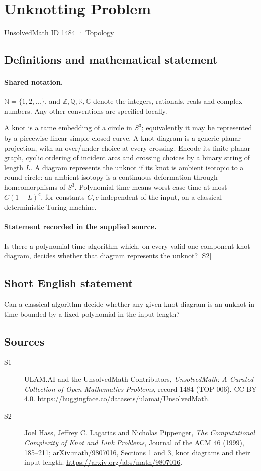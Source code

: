 \documentclass[11pt]{article}
\newcommand{\sref}[2]{\hyperlink{source:#1:#2}{[S#2]}}
\begin{document}
\setcounter{section}{1483}
\section{Unknotting Problem}\label{1484}
{\small\sffamily UnsolvedMath ID 1484 · Topology}
\subsection{Definitions and mathematical statement}

\paragraph{Shared notation.}$\mathbb N=\{1,2,\ldots\}$, and $\mathbb Z,\mathbb Q,\mathbb R,\mathbb C$ denote the integers, rationals, reals and complex numbers. Any other conventions are specified locally.


A knot is a tame embedding of a circle in \(S^3\); equivalently it may
be represented by a piecewise-linear simple closed curve.
A knot diagram is a generic planar projection, with an over/under choice
at every crossing. Encode its finite planar graph, cyclic ordering of
incident arcs and crossing choices by a binary string of length \(L\).
A diagram represents the unknot if its knot is ambient isotopic to a
round circle: an ambient isotopy is a continuous deformation through
homeomorphisms of \(S^3\). Polynomial time means worst-case time
at most \(C(1+L)^c\), for constants \(C,c\) independent of the input,
on a classical deterministic Turing machine.
\paragraph{Statement recorded in the supplied source.}
Is there a polynomial-time algorithm which, on every valid
one-component knot diagram, decides whether that diagram represents
the unknot? \sref{1484}{2}
\subsection{Short English statement}
Can a classical algorithm decide whether any given knot diagram is an unknot in time bounded by a fixed polynomial in the input length?
\subsection{Sources}
\begin{description}
\item[\hypertarget{source:1484:1}{S1}] ULAM.AI and the UnsolvedMath Contributors, \emph{UnsolvedMath: A Curated Collection of Open Mathematics Problems}, record 1484 (TOP-006). CC BY 4.0. \url{https://huggingface.co/datasets/ulamai/UnsolvedMath}.
\item[\hypertarget{source:1484:2}{S2}] Joel Hass, Jeffrey C. Lagarias and Nicholas Pippenger, \emph{The Computational Complexity of Knot and Link Problems}, Journal of the ACM 46 (1999), 185--211; arXiv:math/9807016, Sections 1 and 3, knot diagrams and their input length. \url{https://arxiv.org/abs/math/9807016}.
\end{description}
\label{end:1484}
\end{document}
